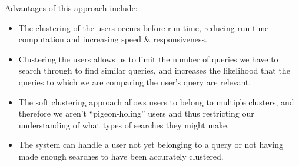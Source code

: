 \documentclass[a4paper]{article}
\begin{document}
Advantages of this approach include:
\begin{itemize}
    \item   The clustering of the users occurs before run-time, reducing run-time computation and increasing speed \& responsiveness.
    \item   Clustering the users allows us to limit the number of queries we have to search through to find similar queries, and increases the likelihood that the queries to which we are comparing the user's query are relevant.
    \item   The soft clustering approach allows users to belong to multiple clusters, and therefore we aren't ``pigeon-holing'' users and thus restricting our understanding of what types of searches they might make. 
    \item   The system can handle a user not yet belonging to a query or not having made enough searches to have been accurately clustered.
\end{itemize}
\end{document}
